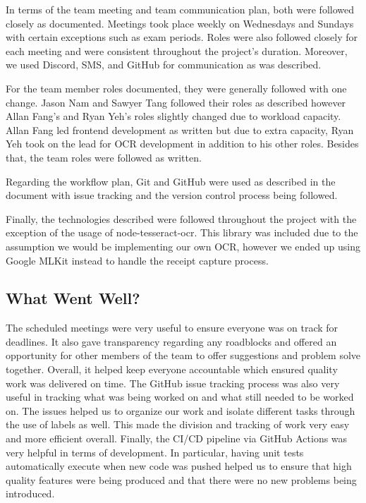 \documentclass{article}
\begin{document}

In terms of the team meeting and team communication plan, both were followed closely as documented.
Meetings took place weekly on Wednesdays and Sundays with certain exceptions such as exam periods. Roles were
also followed closely for each meeting and were consistent throughout the project's duration. Moreover, we used Discord,
SMS, and GitHub for communication as was described.

For the team member roles documented, they were generally followed with one change. Jason Nam and Sawyer Tang
followed their roles as described however Allan Fang's and Ryan Yeh's roles slightly changed due to workload capacity.
Allan Fang led frontend development as written but due to extra capacity, Ryan Yeh took on the lead for OCR development in addition
to his other roles. Besides that, the team roles were followed as written.

Regarding the workflow plan, Git and GitHub were used as described in the document with issue tracking and the
version control process being followed.

Finally, the technologies described were followed throughout the project with the exception of the usage of
node-tesseract-ocr. This library was included due to the assumption we would be implementing our own OCR, however
we ended up using Google MLKit instead to handle the receipt capture process.

\subsection{What Went Well?}


The scheduled meetings were very useful to ensure everyone was on track for deadlines.
It also gave transparency regarding any roadblocks and offered an opportunity for other members
of the team to offer suggestions and problem solve together. Overall, it helped keep everyone accountable
which ensured quality work was delivered on time. The GitHub issue tracking process was also very
useful in tracking what was being worked on and what still needed to be worked on. The issues helped us to organize
our work and isolate different tasks through the use of labels as well. This made the division and tracking of work
very easy and more efficient overall. Finally, the CI/CD pipeline via GitHub Actions was very helpful in terms
of development. In particular, having unit tests automatically execute when new code was
pushed helped us to ensure that high quality features were being produced and that there were no new problems being introduced.
\end{document}
